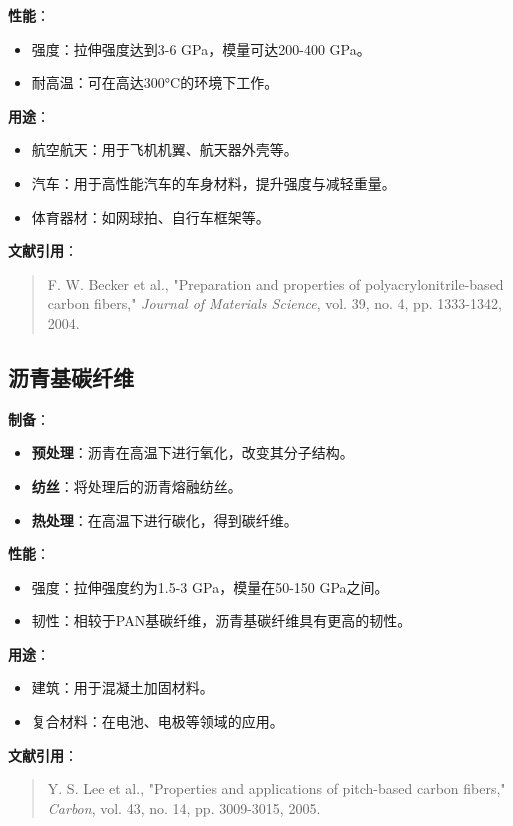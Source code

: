 \documentclass[UTF8]{report}
\theoremstyle{MyLineTheoremStyle} %
\theoremstyle{MyBlockTheoremStyle} %
\theoremstyle{MySubsubsectionStyle} %
\begin{document}
\textbf{性能}：
\begin{itemize}
    \item 强度：拉伸强度达到3-6 GPa，模量可达200-400 GPa。
    \item 耐高温：可在高达300°C的环境下工作。
\end{itemize}

\textbf{用途}：
\begin{itemize}
    \item 航空航天：用于飞机机翼、航天器外壳等。
    \item 汽车：用于高性能汽车的车身材料，提升强度与减轻重量。
    \item 体育器材：如网球拍、自行车框架等。
\end{itemize}

\textbf{文献引用}：
\begin{quote}
F. W. Becker et al., "Preparation and properties of polyacrylonitrile-based carbon fibers," \textit{Journal of Materials Science}, vol. 39, no. 4, pp. 1333-1342, 2004.
\end{quote}

\subsection{沥青基碳纤维}
\textbf{制备}：
\begin{itemize}
    \item \textbf{预处理}：沥青在高温下进行氧化，改变其分子结构。
    \item \textbf{纺丝}：将处理后的沥青熔融纺丝。
    \item \textbf{热处理}：在高温下进行碳化，得到碳纤维。
\end{itemize}

\textbf{性能}：
\begin{itemize}
    \item 强度：拉伸强度约为1.5-3 GPa，模量在50-150 GPa之间。
    \item 韧性：相较于PAN基碳纤维，沥青基碳纤维具有更高的韧性。
\end{itemize}

\textbf{用途}：
\begin{itemize}
    \item 建筑：用于混凝土加固材料。
    \item 复合材料：在电池、电极等领域的应用。
\end{itemize}

\textbf{文献引用}：
\begin{quote}
Y. S. Lee et al., "Properties and applications of pitch-based carbon fibers," \textit{Carbon}, vol. 43, no. 14, pp. 3009-3015, 2005.
\end{quote}
\end{document}
